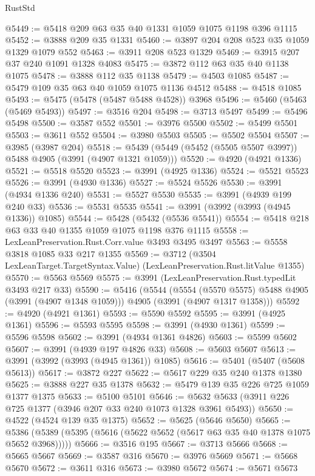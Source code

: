 \begin{lexlean}{RustStd}
\begin{coremodule}
@5449 := @5418 @209 @63 @35 @40 @1331 @1059 @1075 @1198 @396 @1115
@5452 := @3888 @209 @35 @1331
@5460 := @3897 @204 @208 @523 @35 @1059 @1329 @1079 @552
@5463 := @3911 @208 @523 @1329
@5469 := @3915 @207 @37 @240 @1091 @1328 @4083
@5475 := @3872 @112 @63 @35 @40 @1138 @1075
@5478 := @3888 @112 @35 @1138
@5479 := @4503 @1085
@5487 := @5479 @109 @35 @63 @40 @1059 @1075 @1136 @4512
@5488 := @4518 @1085
@5493 := @5475 (@5478 (@5487 @5488 @4528)) @3968
@5496 := @5460 (@5463 (@5469 @5493))
@5497 := @3516 @204
@5498 := @3713 @5497
@5499 := @5496 @5498
@5500 := @3587 @552
@5501 := @3976 @5500
@5502 := @5499 @5501
@5503 := @3611 @552
@5504 := @3980 @5503
@5505 := @5502 @5504
@5507 := @3985 (@3987 @204)
@5518 := @5439 (@5449 (@5452 (@5505 @5507 @3997)) @5488 @4905 (@3991 (@4907 @1321 @1059)))
@5520 := @4920 (@4921 @1336)
@5521 := @5518 @5520
@5523 := @3991 (@4925 @1336)
@5524 := @5521 @5523
@5526 := @3991 (@4930 @1336)
@5527 := @5524 @5526
@5530 := @3991 (@4934 @1336 @240)
@5531 := @5527 @5530
@5535 := @3991 (@4939 @199 @240 @33)
@5536 := @5531 @5535
@5541 := @3991 (@3992 (@3993 (@4945 @1336)) @1085)
@5544 := @5428 (@5432 (@5536 @5541))
@5554 := @5418 @218 @63 @33 @40 @1355 @1059 @1075 @1198 @376 @1115
@5558 := LexLeanPreservation.Rust.Corr.value @3493 @3495 @3497
@5563 := @5558 @3818 @1085 @33 @217 @1355
@5569 := @3712 (@3504 LexLeanTarget.TargetSyntax.Value) (LexLeanPreservation.Rust.litValue @1355)
@5570 := @5563 @5569
@5575 := @3991 (LexLeanPreservation.Rust.typedLit @3493 @217 @33)
@5590 := @5416
    (@5544
      (@5554 (@5570 @5575) @5488 @4905 (@3991 (@4907 @1348 @1059)))
      @4905
      (@3991 (@4907 @1317 @1358)))
@5592 := @4920 (@4921 @1361)
@5593 := @5590 @5592
@5595 := @3991 (@4925 @1361)
@5596 := @5593 @5595
@5598 := @3991 (@4930 @1361)
@5599 := @5596 @5598
@5602 := @3991 (@4934 @1361 @4826)
@5603 := @5599 @5602
@5607 := @3991 (@4939 @197 @4826 @33)
@5608 := @5603 @5607
@5613 := @3991 (@3992 (@3993 (@4945 @1361)) @1085)
@5616 := @5401 (@5407 (@5608 @5613))
@5617 := @3872 @227
@5622 := @5617 @229 @35 @240 @1378 @1380
@5625 := @3888 @227 @35 @1378
@5632 := @5479 @139 @35 @226 @725 @1059 @1377 @1375
@5633 := @5100 @5101
@5646 := @5632 @5633 (@3911 @226 @725 @1377 (@3946 @207 @33 @240 @1073 @1328 @3961 @5493))
@5650 := @4522 (@4524 @139 @35 @1375)
@5652 := @5625 (@5646 @5650)
@5665 := @5386 (@5389 (@5395 (@5616 (@5622 @5652 (@5617 @63 @35 @40 @1378 @1075 @5652 @3968)))))
@5666 := @3516 @195
@5667 := @3713 @5666
@5668 := @5665 @5667
@5669 := @3587 @316
@5670 := @3976 @5669
@5671 := @5668 @5670
@5672 := @3611 @316
@5673 := @3980 @5672
@5674 := @5671 @5673

\end{coremodule}
\end{lexlean}
